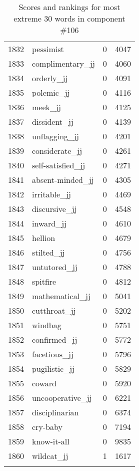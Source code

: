 \begin{longtable}[!htbp]{| rlr@{.}l |}
    1832 & pessimist & 0 & 4047 \\
    1833 & complimentary\_jj & 0 & 4060 \\
    1834 & orderly\_jj & 0 & 4091 \\
    1835 & polemic\_jj & 0 & 4116 \\
    1836 & meek\_jj & 0 & 4125 \\
    1837 & dissident\_jj & 0 & 4139 \\
    1838 & unflagging\_jj & 0 & 4201 \\
    1839 & considerate\_jj & 0 & 4261 \\
    1840 & self-satisfied\_jj & 0 & 4271 \\
    1841 & absent-minded\_jj & 0 & 4305 \\
    1842 & irritable\_jj & 0 & 4469 \\
    1843 & discursive\_jj & 0 & 4548 \\
    1844 & inward\_jj & 0 & 4610 \\
    1845 & hellion & 0 & 4679 \\
    1846 & stilted\_jj & 0 & 4756 \\
    1847 & untutored\_jj & 0 & 4788 \\
    1848 & spitfire & 0 & 4812 \\
    1849 & mathematical\_jj & 0 & 5041 \\
    1850 & cutthroat\_jj & 0 & 5202 \\
    1851 & windbag & 0 & 5751 \\
    1852 & confirmed\_jj & 0 & 5772 \\
    1853 & facetious\_jj & 0 & 5796 \\
    1854 & pugilistic\_jj & 0 & 5829 \\
    1855 & coward & 0 & 5920 \\
    1856 & uncooperative\_jj & 0 & 6221 \\
    1857 & disciplinarian & 0 & 6374 \\
    1858 & cry-baby & 0 & 7194 \\
    1859 & know-it-all & 0 & 9835 \\
    1860 & wildcat\_jj & 1 & 1617 \\
    \hline
    \caption{Scores and rankings for most extreme 30 words in component \#106} \\
\end{longtable}
